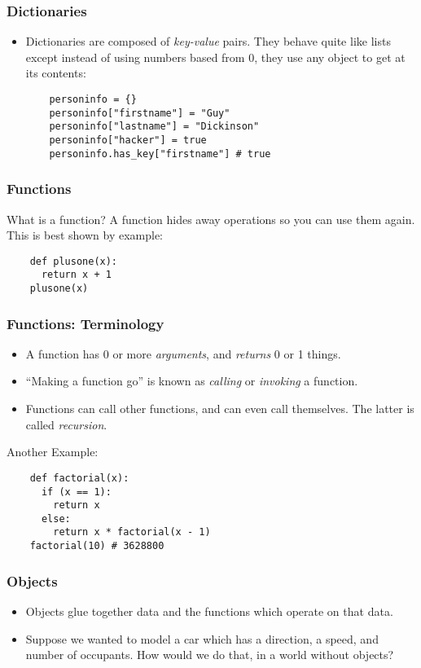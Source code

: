 \documentclass{beamer}
\begin{document}
\begin{frame}[fragile]
  \frametitle {Dictionaries}
\begin{itemize}
  \item Dictionaries are composed of \emph{key-value} pairs. They behave quite like lists except instead of using numbers based from 0, they use any object to get at its contents:\\
  
  \begin{lstlisting}
    personinfo = {}
    personinfo["firstname"] = "Guy"
    personinfo["lastname"] = "Dickinson"
    personinfo["hacker"] = true
    personinfo.has_key["firstname"] # true
  \end{lstlisting}
\end{itemize}
\end{frame}


\begin{frame}[fragile]
  \frametitle {Functions}
  What is a function?
  A function hides away operations so you can use them again. This is best shown by example:
  \begin{lstlisting}
    def plusone(x):
      return x + 1
    plusone(x)
  \end{lstlisting}
\end{frame}

\begin{frame}[fragile]
  \frametitle {Functions: Terminology}
  \begin{itemize}
    \item A function has 0 or more \emph{arguments}, and \emph{returns} 0 or 1 things.
    \item ``Making a function go'' is known as \emph{calling} or \emph{invoking} a function.
    \item Functions can call other functions, and can even call themselves. The latter is called \emph{recursion}. 
  \end{itemize}
  Another Example:
  \begin{lstlisting}
    def factorial(x):
      if (x == 1):
        return x
      else:
        return x * factorial(x - 1)
    factorial(10) # 3628800
  \end{lstlisting}
  
\end{frame}


\begin{frame}[fragile]
  \frametitle {Objects}
  \begin{itemize}
    \item Objects glue together data and the functions which operate on that data.
    \item Suppose we wanted to model a car which has a direction, a speed, and number of occupants. How would we do that, in a world without objects?
  \end{itemize}
\end{frame}
\end{document}
